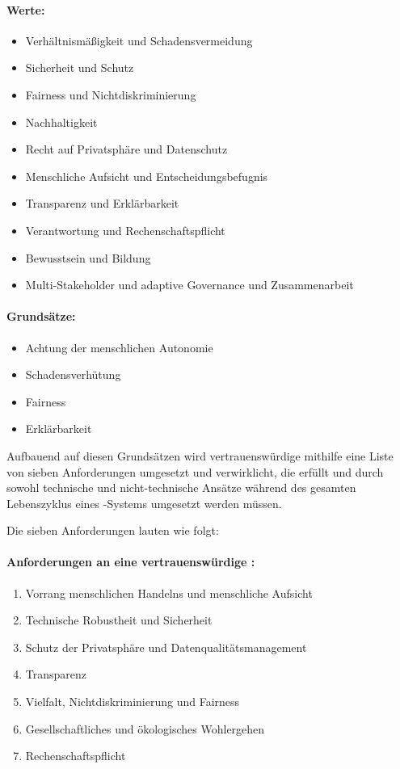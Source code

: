\documentclass[12pt]{report}
\begin{document}
\paragraph{Werte:}
\begin{itemize}
	\item  Verhältnismäßigkeit und Schadensvermeidung
	\item  Sicherheit und Schutz
	\item  Fairness und Nichtdiskriminierung
	\item  Nachhaltigkeit
	\item  Recht auf Privatsphäre und Datenschutz
	\item  Menschliche Aufsicht und Entscheidungsbefugnis
	\item  Transparenz und Erklärbarkeit
	\item  Verantwortung und Rechenschaftspflicht
	\item  Bewusstsein und Bildung
	\item Multi-Stakeholder und adaptive Governance und Zusammenarbeit
\end{itemize}

\paragraph{Grundsätze:}
\begin{itemize}
	\item  Achtung der menschlichen Autonomie
	\item  Schadensverhütung
	\item  Fairness
	\item  Erklärbarkeit
\end{itemize}

Aufbauend auf diesen Grundsätzen wird vertrauenswürdige  mithilfe eine Liste von sieben Anforderungen umgesetzt und verwirklicht, die erfüllt und durch sowohl technische und nicht-technische Ansätze während des gesamten Lebenszyklus eines -Systems umgesetzt werden müssen.

Die sieben Anforderungen lauten wie folgt:

\paragraph{Anforderungen an eine vertrauenswürdige :}
\begin{enumerate}
	\item  Vorrang menschlichen Handelns und menschliche Aufsicht
	\item  Technische Robustheit und Sicherheit
	\item  Schutz der Privatsphäre und Datenqualitätsmanagement
	\item  Transparenz
	\item  Vielfalt, Nichtdiskriminierung und Fairness
	\item  Gesellschaftliches und ökologisches Wohlergehen
	\item  Rechenschaftspflicht
\end{enumerate}
\end{document}
